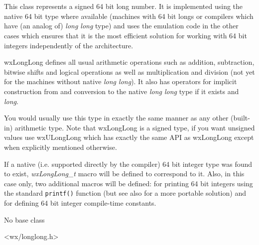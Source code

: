 
\section{}\label{wxlonglong}

This class represents a signed 64 bit long number. It is implemented using the
native 64 bit type where available (machines with 64 bit longs or compilers
which have (an analog of) {\it long long} type) and uses the emulation code in
the other cases which ensures that it is the most efficient solution for
working with 64 bit integers independently of the architecture.

wxLongLong defines all usual arithmetic operations such as addition,
subtraction, bitwise shifts and logical operations as well as multiplication
and division (not yet for the machines without native {\it long long}). It
also has operators for implicit construction from and conversion to the native 
{\it long long} type if it exists and {\it long}.

You would usually use this type in exactly the same manner as any other
(built-in) arithmetic type. Note that wxLongLong is a signed type, if you
want unsigned values use wxULongLong which has exactly the same API as
wxLongLong except when explicitly mentioned otherwise.

If a native (i.e. supported directly by the compiler) 64 bit integer type was
found to exist, {\it wxLongLong\_t} macro will be defined to correspond to it.
Also, in this case only, two additional macros will be defined: 
 for printing 64 bit integers
using the standard {\tt printf()} function (but see also 
 for a more portable solution) and
 for defining 64 bit integer compile-time constants.


No base class


<wx/longlong.h>



